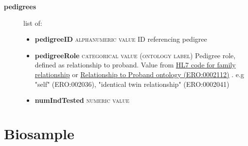 \documentclass[a4paper, 10pt]{article}        %
\begin{document}
\begin{description}
	\item[\textbf{pedigrees}] list of:
	\begin{itemize}
			\item[] \textbf{pedigreeID} {\textsc{alphanumeric value}}  ID referencing pedigree
			\item[] \textbf{pedigreeRole} {\textsc{categorical value (ontology label)}} Pedigree role, defined as relationship to proband. Value from \href{link}{HL7 code for family relationship} or \href{link}{Relationship to Proband ontology (ERO:0002112)} . e.g "self" (ERO:002036), "identical twin relationship" (ERO:0002041)
			\item[] \textbf{numIndTested} {\textsc{numeric value}}
	\end{itemize}


 \end{description}

  
  \section*{ {\color{teal} Biosample}}
  
\end{document}
